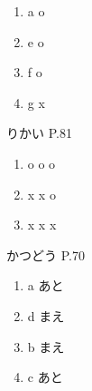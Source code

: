 \documentclass[a4paper,lualatex,ja=standard,base=10pt]{bxjsarticle}
\begin{document}
\begin{enumerate}
  \item a o
  \item e o
  \item f o
  \item g x
\end{enumerate}

りかい P.81

\begin{enumerate}
  \item o o o
  \item x x o
  \item x x x
\end{enumerate}

かつどう P.70

\begin{enumerate}
  \item a あと
  \item d まえ
  \item b まえ
  \item c あと
\end{enumerate}
\end{document}
